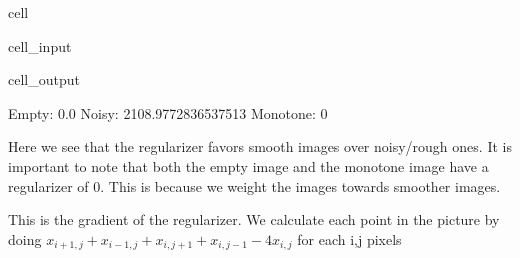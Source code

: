 \documentclass[letterpaper,10pt,english]{jupyterBook}
\begin{document}
\begin{sphinxuseclass}{cell}\begin{sphinxVerbatimInput}

\begin{sphinxuseclass}{cell_input}
\begin{sphinxVerbatim}[commandchars=\\\{\}]
\end{sphinxVerbatim}

\end{sphinxuseclass}\end{sphinxVerbatimInput}
\begin{sphinxVerbatimOutput}

\begin{sphinxuseclass}{cell_output}
\begin{sphinxVerbatim}[commandchars=\\\{\}]
Empty: \PYGZhy{}0.0
Noisy: \PYGZhy{}2108.9772836537513
Monotone: 0
\end{sphinxVerbatim}

\end{sphinxuseclass}\end{sphinxVerbatimOutput}

\end{sphinxuseclass}
\sphinxAtStartPar
Here we see that the regularizer favors smooth images over noisy/rough ones. It is important to note that both the empty image and the monotone image have a regularizer of 0. This is because we weight the images towards smoother images.

\sphinxAtStartPar
This is the gradient of the regularizer.
We calculate each point in the picture by doing \(x_{i+1,j} + x_{i-1,j} + x_{i,j+1} + x_{i,j-1} - 4x_{i,j}\) for each i,j pixels
\end{document}
